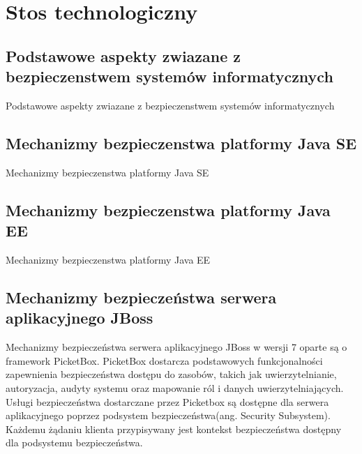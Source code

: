 \chapter{Stos technologiczny}
\label{cha:stosTechnologiczny}


\section{Podstawowe aspekty zwiazane z bezpieczenstwem systemów informatycznych}
\label{sec:aspektyBezpieczenstwa}

Podstawowe aspekty zwiazane z bezpieczenstwem systemów informatycznych


\section{Mechanizmy bezpieczenstwa platformy Java SE}
\label{sec:javaSE}

Mechanizmy bezpieczenstwa platformy Java SE



\section{Mechanizmy bezpieczenstwa platformy Java EE}
\label{sec:javaEE}

Mechanizmy bezpieczenstwa platformy Java EE


\section{Mechanizmy bezpieczeństwa serwera aplikacyjnego JBoss}
\label{sec:jboss}

	Mechanizmy bezpieczeństwa serwera aplikacyjnego JBoss w wersji 7 oparte są o framework PicketBox. PicketBox dostarcza podstawowych funkcjonalności zapewnienia bezpieczeństwa dostępu do zasobów, takich jak uwierzytelnianie, autoryzacja, audyty systemu oraz mapowanie ról i danych uwierzytelniających. Usługi bezpieczeństwa dostarczane przez Picketbox są dostępne dla serwera aplikacyjnego poprzez podsystem bezpieczeństwa(ang. Security Subsystem).  Każdemu żądaniu klienta przypisywany jest kontekst bezpieczeństwa dostępny dla podsystemu bezpieczeństwa. 

